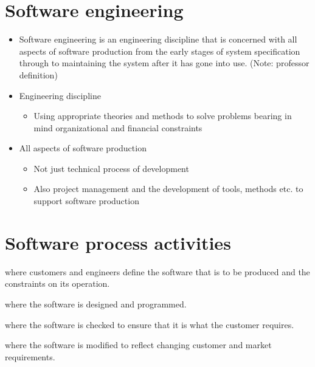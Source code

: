 \documentclass{article}
\begin{document}
\section{Software engineering}
\vspace{-8pt}
\begin{itemize}
  \addtolength{\itemindent}{0cm}
  \setlength\itemsep{-.25em}
  \item Software engineering is an engineering discipline that is concerned with all aspects of software production from the early stages of system specification through to maintaining the system after it has gone into use. (Note: professor definition)
  \item Engineering discipline
  \begin{itemize}
	\vspace{-8pt}
    \setlength\itemsep{-.25em}
    \item Using appropriate theories and methods to solve problems bearing in mind
organizational and financial constraints
\end{itemize}
  \item All aspects of software production
  \begin{itemize}
	\vspace{-8pt}
    \setlength\itemsep{-.25em}
    \item Not just technical process of development
    \item Also project management and the development of tools, methods etc. to support software production
  \end{itemize}
\end{itemize}

\section{Software process activities}
\vspace{-8pt}
\begin{description}
  \addtolength{\itemindent}{0cm}
  \setlength\itemsep{-.25em}
  \item [Software specification] where customers and engineers
define the software that is to be produced and the constraints on its operation.
  \item [Software development] where the software is designed and programmed.
  \item [Software validation] where the software is checked to ensure that it is what the customer requires.
  \item [Software evolution] where the software is modified to reflect changing customer and market requirements.
\end{description}
\end{document}
